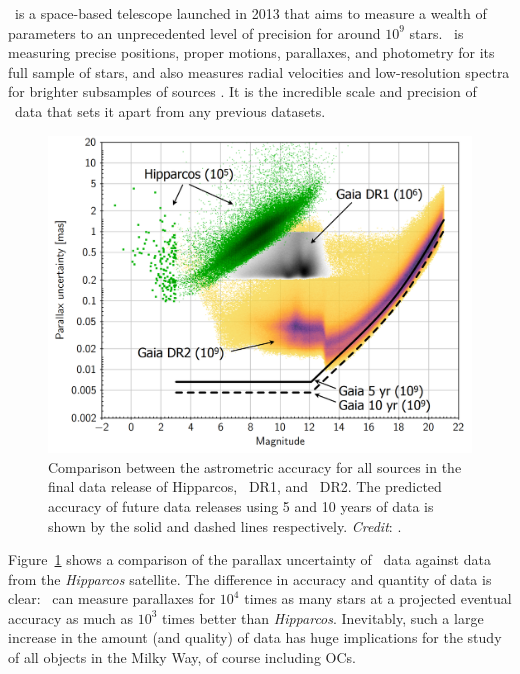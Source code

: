 \gaia\ is a space-based telescope launched in 2013 that aims to measure a wealth of parameters to an unprecedented level of precision for around $10^9$ stars. \gaia\ is measuring precise positions, proper motions, parallaxes, and photometry for its full sample of stars, and also measures radial velocities and low-resolution spectra for brighter subsamples of sources \citep{gaia_collaboration_gaia_2016}. It is the incredible scale and precision of \gaia\ data that sets it apart from any previous datasets.

\begin{figure}[tb]
	\includegraphics[width=\textwidth]{fig/c1/gaia_dr2_astrometry.png}
	\caption[Comparison between the astrometric accuracy for Hipparcos, Gaia, and future Gaia data releases]{Comparison between the astrometric accuracy for all sources in the final data release of Hipparcos, \gaia\ DR1, and \gaia\ DR2. The predicted accuracy of future data releases using 5 and 10 years of data is shown by the solid and dashed lines respectively. \emph{Credit}: \cite{lindegren_gaia_2018}.}
	\label{fig:intro:history:gaia_accuracy}
\end{figure}

Figure~\ref{fig:intro:history:gaia_accuracy} shows a comparison of the parallax uncertainty of \gaia\ data against data from the \emph{Hipparcos} satellite. The difference in accuracy and quantity of data is clear: \gaia\ can measure parallaxes for $10^4$ times as many stars at a projected eventual accuracy as much as $10^3$ times better than \emph{Hipparcos}. Inevitably, such a large increase in the amount (and quality) of data has huge implications for the study of all objects in the Milky Way, of course including OCs.

